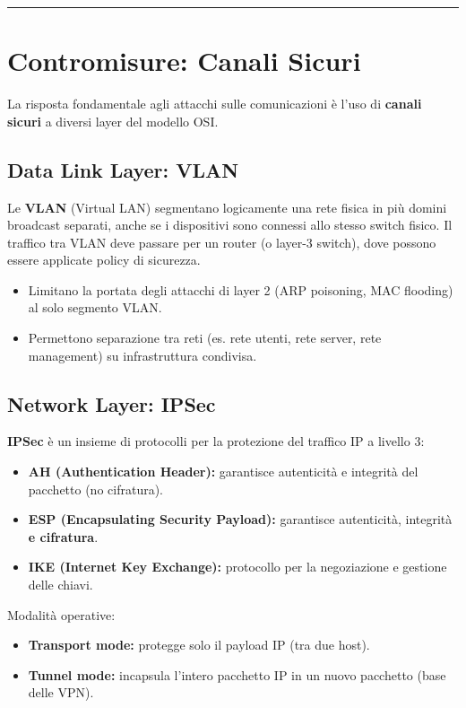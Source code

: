 \documentclass[12pt, a4paper]{report}
\begin{document}
\noindent\rule{\textwidth}{0.4pt}

\section{Contromisure: Canali Sicuri}

La risposta fondamentale agli attacchi sulle comunicazioni è l'uso di \textbf{canali sicuri} a diversi layer del modello OSI.

\subsection{Data Link Layer: VLAN}
Le \textbf{VLAN} (Virtual LAN) segmentano logicamente una rete fisica in più domini broadcast separati, anche se i dispositivi sono connessi allo stesso switch fisico. Il traffico tra VLAN deve passare per un router (o layer-3 switch), dove possono essere applicate policy di sicurezza.
\begin{itemize}
	\item Limitano la portata degli attacchi di layer 2 (ARP poisoning, MAC flooding) al solo segmento VLAN.
	\item Permettono separazione tra reti (es. rete utenti, rete server, rete management) su infrastruttura condivisa.
\end{itemize}

\subsection{Network Layer: IPSec}
\textbf{IPSec} è un insieme di protocolli per la protezione del traffico IP a livello 3:
\begin{itemize}
	\item \textbf{AH (Authentication Header):} garantisce autenticità e integrità del pacchetto (no cifratura).
	\item \textbf{ESP (Encapsulating Security Payload):} garantisce autenticità, integrità \textbf{e cifratura}.
	\item \textbf{IKE (Internet Key Exchange):} protocollo per la negoziazione e gestione delle chiavi.
\end{itemize}

Modalità operative:
\begin{itemize}
	\item \textbf{Transport mode:} protegge solo il payload IP (tra due host).
	\item \textbf{Tunnel mode:} incapsula l'intero pacchetto IP in un nuovo pacchetto (base delle VPN).
\end{itemize}
\end{document}
